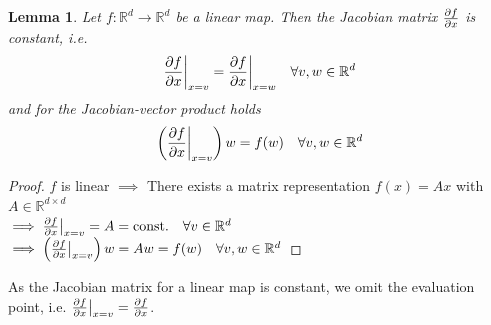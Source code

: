 \documentclass[twoside,a4paper]{article}
\newtheorem{lemma}{Lemma}
\begin{document}
\begin{lemma}\label{jac_linear_map}
	Let $f: \mathbb{R}^d \to \mathbb{R}^d$ be a linear map. Then the Jacobian matrix
	$\frac{\partial f}{\partial x}$ is constant, i.e.
	\begin{equation*}
		\frac{\partial f}{\partial x} \bigg|_{x = v} = \frac{\partial f}{\partial x} \bigg|_{x = w} \quad \forall v,w \in \mathbb{R}^d
	\end{equation*}
	and for the Jacobian-vector product holds
	\begin{equation*}
		\left( \frac{\partial f}{\partial x} \bigg|_{x = v} \right) w = f(w) \quad \forall v,w \in \mathbb{R}^d
	\end{equation*}
\end{lemma}
\begin{proof}
	$f$ is linear $\implies$ There exists a matrix representation $f(x) = Ax$ with
	$A \in \mathbb{R}^{d \times d}$ \\
	$\implies \frac{\partial f}{\partial x} \big|_{x=v} = A = \text{const.} \quad \forall v \in \mathbb{R}^d$
	$\implies \left( \frac{\partial f}{\partial x} \big|_{x=v} \right) w = Aw = f(w) \quad \forall v,w \in \mathbb{R}^d$
\end{proof}
As the Jacobian matrix for a linear map is constant, we omit the evaluation point, i.e.
$\frac{\partial f}{\partial x} \big|_{x=v} = \frac{\partial f}{\partial x}$.
\end{document}
